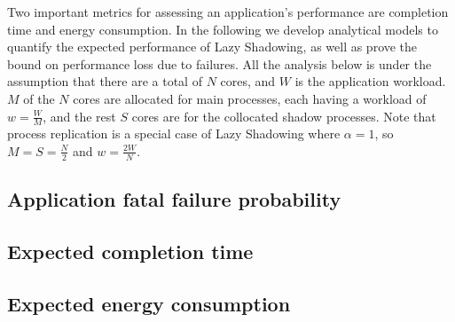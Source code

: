 Two important metrics for assessing an application's performance are completion time and energy consumption. In the following we develop analytical models to quantify the expected performance of Lazy Shadowing, as well as prove the bound on performance loss due to failures. %
All the analysis below is under the assumption that there are a total of $N$ cores, and $W$ is the application workload.  
$M$ of the $N$ cores are allocated for main processes, each having a workload of $w=\frac{W}{M}$, and the rest $S$ cores are for the collocated shadow processes. %
Note that process replication is a special case of Lazy Shadowing where $\alpha=1$, so 
$M=S=\frac{N}{2}$ and $w=\frac{2W}{N}$. 


\subsection{Application fatal failure probability}
\label{anal_app_fail}


\subsection{Expected completion time}
\label{anal_time}


\subsection{Expected energy consumption}
\label{anal_energy}

